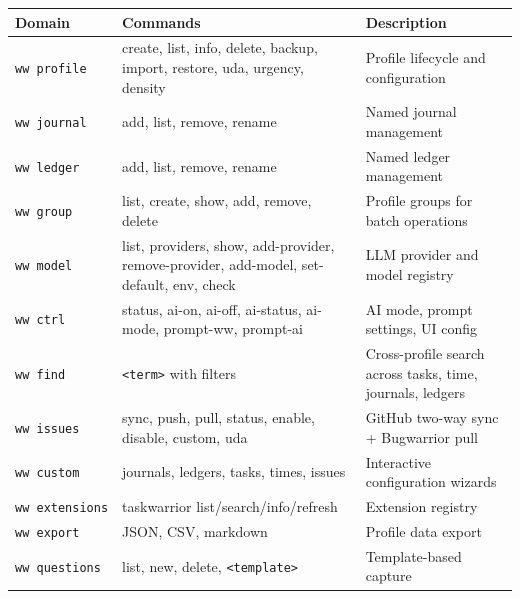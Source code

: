 \documentclass[
]{article}
\newcounter{none} %
\begin{document}
{\def\LTcaptype{none} %
\begin{longtable}[]{@{}
  >{\raggedright\arraybackslash}p{}
  >{\raggedright\arraybackslash}p{}
  >{\raggedright\arraybackslash}p{}@{}}
\toprule\noalign{}
\begin{minipage}[b]{\linewidth}\raggedright
Domain
\end{minipage} & \begin{minipage}[b]{\linewidth}\raggedright
Commands
\end{minipage} & \begin{minipage}[b]{\linewidth}\raggedright
Description
\end{minipage} \\
\midrule\noalign{}
\endhead
\bottomrule\noalign{}
\endlastfoot
\texttt{ww\ profile} & create, list, info, delete, backup, import,
restore, uda, urgency, density & Profile lifecycle and configuration \\
\texttt{ww\ journal} & add, list, remove, rename & Named journal
management \\
\texttt{ww\ ledger} & add, list, remove, rename & Named ledger
management \\
\texttt{ww\ group} & list, create, show, add, remove, delete & Profile
groups for batch operations \\
\texttt{ww\ model} & list, providers, show, add-provider,
remove-provider, add-model, set-default, env, check & LLM provider and
model registry \\
\texttt{ww\ ctrl} & status, ai-on, ai-off, ai-status, ai-mode,
prompt-ww, prompt-ai & AI mode, prompt settings, UI config \\
\texttt{ww\ find} & \texttt{\textless{}term\textgreater{}} with filters
& Cross-profile search across tasks, time, journals, ledgers \\
\texttt{ww\ issues} & sync, push, pull, status, enable, disable, custom,
uda & GitHub two-way sync + Bugwarrior pull \\
\texttt{ww\ custom} & journals, ledgers, tasks, times, issues &
Interactive configuration wizards \\
\texttt{ww\ extensions} & taskwarrior list/search/info/refresh &
Extension registry \\
\texttt{ww\ export} & JSON, CSV, markdown & Profile data export \\
\texttt{ww\ questions} & list, new, delete,
\texttt{\textless{}template\textgreater{}} & Template-based capture

\end{longtable}}
\end{document}
